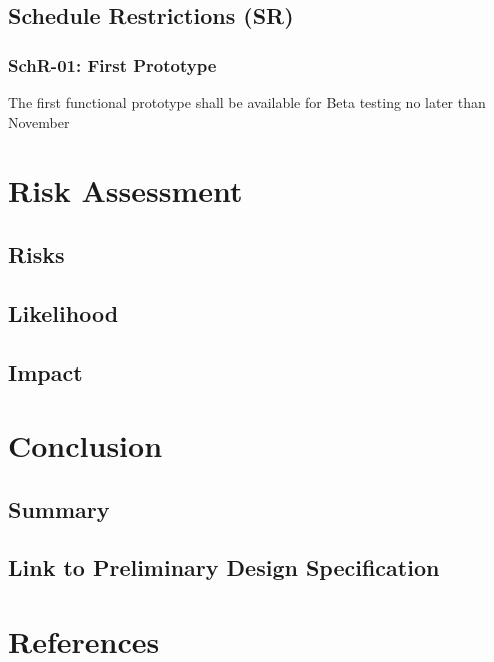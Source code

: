 \documentclass[]{report}
\begin{document}
\section{Schedule Restrictions (SR)}

\subsection{SchR-01: First Prototype}

The first functional prototype shall be available for Beta testing no later than November 

\chapter{Risk Assessment}

\section{Risks}

\section{Likelihood}

\section{Impact}

\chapter{Conclusion}

\section{Summary}

\section{Link to Preliminary Design Specification}

\chapter*{References}
\end{document}
